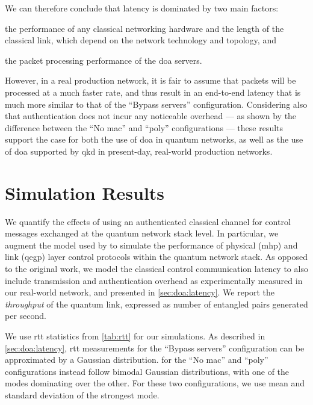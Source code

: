 We can therefore conclude that latency is dominated by two main factors:
%
\begin{inlinelist}
    \item the performance of any classical networking hardware and the length of the classical link,
          which depend on the network technology and topology, and
    \item the packet processing performance of the \acrshort{doa} servers.
\end{inlinelist}
However, in a real production network, it is fair to assume that packets will be processed at a much
faster rate, and thus result in an end-to-end latency that is much more similar to that of the
``Bypass servers'' configuration. Considering also that authentication does not incur any noticeable
overhead --- as shown by the difference between the ``No \acrshort{mac}'' and ``\acrshort{poly}''
configurations --- these results support the case for both the use of \acrshort{doa} in quantum
networks, as well as the use of \acrshort{doa} supported by \acrshort{qkd} in present-day,
real-world production networks.

\section{Simulation Results}
\label{sec:doa:results}

We quantify the effects of using an authenticated classical channel for control messages exchanged
at the quantum network stack level. In particular, we augment the model used by
\textcite{dahlberg_2019_egp} to simulate the performance of physical (\acrshort{mhp}) and link
(\acrshort{qegp}) layer control protocols within the quantum network stack. As opposed to the
original work, we model the classical control communication latency to also include transmission and
authentication overhead as experimentally measured in our real-world network, and presented in
\cref{sec:doa:latency}. We report the \emph{throughput} of the quantum link, expressed as number of
entangled pairs generated per second.

We use \acrshort{rtt} statistics from \cref{tab:rtt} for our simulations. As described in
\cref{sec:doa:latency}, \acrshort{rtt} measurements for the ``Bypass servers'' configuration can be
approximated by a Gaussian distribution.  for the ``No \acrshort{mac}'' and
``\acrshort{poly}'' configurations instead follow bimodal Gaussian distributions, with one of the
modes dominating over the other. For these two configurations, we use mean and standard deviation of
the strongest mode.

